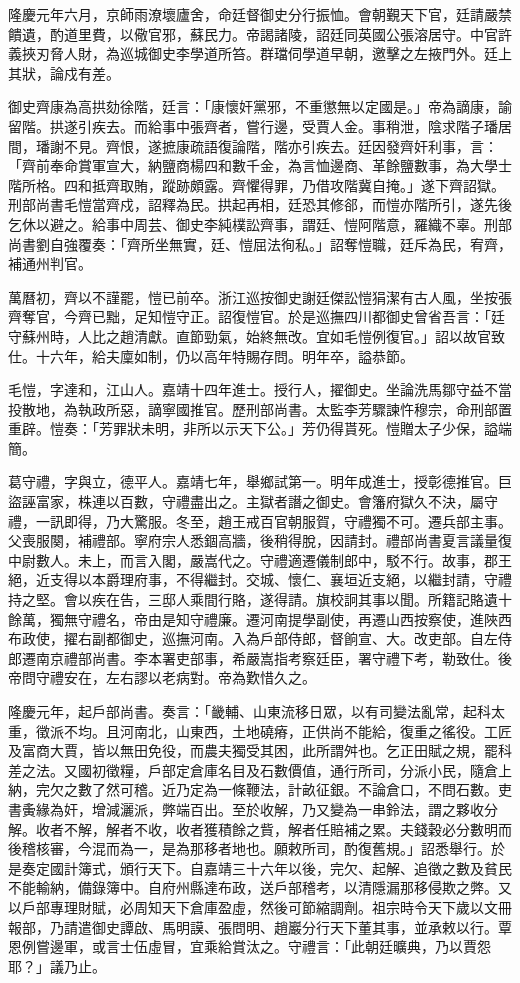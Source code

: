 \begin{pinyinscope}
隆慶元年六月，京師雨潦壞廬舍，命廷督御史分行振恤。會朝覲天下官，廷請嚴禁饋遺，酌道里費，以儆官邪，蘇民力。帝謁諸陵，詔廷同英國公張溶居守。中官許義挾刃脅人財，為巡城御史李學道所笞。群璫伺學道早朝，邀擊之左掖門外。廷上其狀，論戍有差。

御史齊康為高拱劾徐階，廷言：「康懷奸黨邪，不重懲無以定國是。」帝為謫康，諭留階。拱遂引疾去。而給事中張齊者，嘗行邊，受賈人金。事稍泄，陰求階子璠居間，璠謝不見。齊恨，遂摭康疏語復論階，階亦引疾去。廷因發齊奸利事，言：「齊前奉命賞軍宣大，納鹽商楊四和數千金，為言恤邊商、革餘鹽數事，為大學士階所格。四和抵齊取賄，蹤跡頗露。齊懼得罪，乃借攻階冀自掩。」遂下齊詔獄。刑部尚書毛愷當齊戍，詔釋為民。拱起再相，廷恐其修郤，而愷亦階所引，遂先後乞休以避之。給事中周芸、御史李純樸訟齊事，謂廷、愷阿階意，羅織不辜。刑部尚書劉自強覆奏：「齊所坐無實，廷、愷屈法徇私。」詔奪愷職，廷斥為民，宥齊，補通州判官。

萬曆初，齊以不謹罷，愷已前卒。浙江巡按御史謝廷傑訟愷狷潔有古人風，坐按張齊奪官，今齊已黜，足知愷守正。詔復愷官。於是巡撫四川都御史曾省吾言：「廷守蘇州時，人比之趙清獻。直節勁氣，始終無改。宜如毛愷例復官。」詔以故官致仕。十六年，給夫廩如制，仍以高年特賜存問。明年卒，謚恭節。

毛愷，字達和，江山人。嘉靖十四年進士。授行人，擢御史。坐論洗馬鄒守益不當投散地，為執政所惡，謫寧國推官。歷刑部尚書。太監李芳驟諫忤穆宗，命刑部置重辟。愷奏：「芳罪狀未明，非所以示天下公。」芳仍得貰死。愷贈太子少保，謚端簡。

葛守禮，字與立，德平人。嘉靖七年，舉鄉試第一。明年成進士，授彰德推官。巨盜誣富家，株連以百數，守禮盡出之。主獄者譖之御史。會籓府獄久不決，屬守禮，一訊即得，乃大驚服。冬至，趙王戒百官朝服賀，守禮獨不可。遷兵部主事。父喪服闋，補禮部。寧府宗人悉錮高牆，後稍得脫，因請封。禮部尚書夏言議量復中尉數人。未上，而言入閣，嚴嵩代之。守禮適遷儀制郎中，駁不行。故事，郡王絕，近支得以本爵理府事，不得繼封。交城、懷仁、襄垣近支絕，以繼封請，守禮持之堅。會以疾在告，三邸人乘間行賂，遂得請。旗校詗其事以聞。所籍記賂遺十餘萬，獨無守禮名，帝由是知守禮廉。遷河南提學副使，再遷山西按察使，進陜西布政使，擢右副都御史，巡撫河南。入為戶部侍郎，督餉宣、大。改吏部。自左侍郎遷南京禮部尚書。李本署吏部事，希嚴嵩指考察廷臣，署守禮下考，勒致仕。後帝問守禮安在，左右謬以老病對。帝為歎惜久之。

隆慶元年，起戶部尚書。奏言：「畿輔、山東流移日眾，以有司變法亂常，起科太重，徵派不均。且河南北，山東西，土地磽瘠，正供尚不能給，復重之徭役。工匠及富商大賈，皆以無田免役，而農夫獨受其困，此所謂舛也。乞正田賦之規，罷科差之法。又國初徵糧，戶部定倉庫名目及石數價值，通行所司，分派小民，隨倉上納，完欠之數了然可稽。近乃定為一條鞭法，計畝征銀。不論倉口，不問石數。吏書夤緣為奸，增減灑派，弊端百出。至於收解，乃又變為一串鈴法，謂之夥收分解。收者不解，解者不收，收者獲積餘之貲，解者任賠補之累。夫錢穀必分數明而後稽核審，今混而為一，是為那移者地也。願敕所司，酌復舊規。」詔悉舉行。於是奏定國計簿式，頒行天下。自嘉靖三十六年以後，完欠、起解、追徵之數及貧民不能輸納，備錄簿中。自府州縣達布政，送戶部稽考，以清隱漏那移侵欺之弊。又以戶部專理財賦，必周知天下倉庫盈虛，然後可節縮調劑。祖宗時令天下歲以文冊報部，乃請遣御史譚啟、馬明謨、張問明、趙巖分行天下董其事，並承敕以行。覃恩例嘗邊軍，或言士伍虛冒，宜乘給賞汰之。守禮言：「此朝廷曠典，乃以賈怨耶？」議乃止。


\end{pinyinscope}
